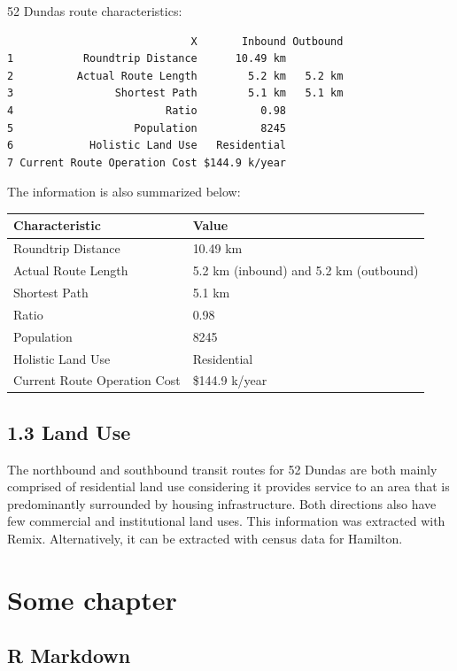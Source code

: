 \documentclass[
11pt, %
oneside, %
english, %
singlespacing, %
]{macthesis} %
\begin{document}
52 Dundas route characteristics:
\begin{verbatim}
                             X       Inbound Outbound
1           Roundtrip Distance      10.49 km         
2          Actual Route Length        5.2 km   5.2 km
3                Shortest Path        5.1 km   5.1 km
4                        Ratio          0.98         
5                   Population          8245         
6            Holistic Land Use   Residential         
7 Current Route Operation Cost $144.9 k/year         
\end{verbatim}
The information is also summarized below:
\begin{longtable}[]{@{}ll@{}}
\toprule\noalign{}
Characteristic & Value \\
\midrule\noalign{}
\endhead
\bottomrule\noalign{}
\endlastfoot
Roundtrip Distance & 10.49 km \\
Actual Route Length & 5.2 km (inbound) and 5.2 km (outbound) \\
Shortest Path & 5.1 km \\
Ratio & 0.98 \\
Population & 8245 \\
Holistic Land Use & Residential \\
Current Route Operation Cost & \$144.9 k/year \\
\end{longtable}
\hypertarget{land-use}{%
\section{1.3 Land Use}\label{land-use}}

The northbound and southbound transit routes for 52 Dundas are both mainly comprised of residential land use considering it provides service to an area that is predominantly surrounded by housing infrastructure. Both directions also have few commercial and institutional land uses. This information was extracted with Remix. Alternatively, it can be extracted with census data for Hamilton.

\hypertarget{some-chapter}{%
\chapter{Some chapter}\label{some-chapter}}

\hypertarget{r-markdown}{%
\section{R Markdown}\label{r-markdown}}
\end{document}
